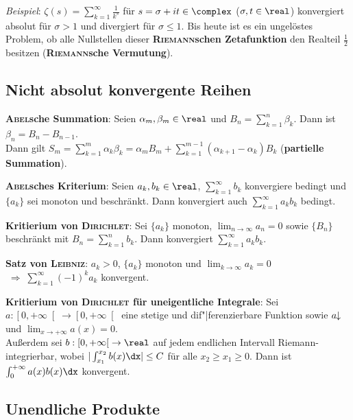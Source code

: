 \emph{Beispiel}: $\zeta(s) = \sum_{k=1}^\infty \frac{1}{k^s}$ für
$s = \sigma + it \in \complex$ ($\sigma, t \in \real$)
konvergiert absolut für $\sigma > 1$ und
divergiert für $\sigma \le 1$.
Bis heute ist es ein ungelöstes Problem, ob alle Nullstellen dieser
\textbf{\textsc{Riemann}schen Zetafunktion} den Realteil $\frac{1}{2}$ besitzen
(\textbf{\textsc{Riemann}sche Vermutung}).

\pagebreak

\subsection{%
    Nicht absolut konvergente Reihen%
}

\textbf{\textsc{Abel}sche Summation}:
Seien $\alpha_m, \beta_m \in \real$ und $B_n = \sum_{k=1}^n \beta_k$.
Dann ist $\beta_n = B_n - B_{n-1}$. \\
Dann gilt $S_m = \sum_{k=1}^m \alpha_k \beta_k =
\alpha_m B_m + \sum_{k=1}^{m-1} (\alpha_{k+1} - \alpha_k) B_k$
(\textbf{partielle Summation}).

\textbf{\textsc{Abel}sches Kriterium}:
Seien $a_k, b_k \in \real$, $\sum_{k=1}^\infty b_k$ konvergiere bedingt
und $\{a_k\}$ sei monoton und beschränkt.
Dann konvergiert auch $\sum_{k=1}^\infty a_k b_k$ bedingt.

\textbf{Kritierium von \textsc{Dirichlet}}:
Sei $\{a_k\}$ monoton, $\lim_{n \to \infty} a_n = 0$ sowie
$\{B_n\}$ beschränkt mit $B_n = \sum_{k=1}^n b_k$.
Dann konvergiert $\sum_{k=1}^\infty a_k b_k$.

\textbf{Satz von \textsc{Leibniz}}:
$a_k > 0$, $\{a_k\}$ monoton und $\lim_{k \to \infty} a_k = 0$
$\;\Rightarrow\; \sum_{k=1}^\infty (-1)^k a_k$ konvergent.

\textbf{Kritierium von \textsc{Dirichlet} für uneigentliche Integrale}:
Sei $a: \left[0, +\infty\right[ \rightarrow \left[0, +\infty\right[$ eine
stetige und dif"|ferenzierbare Funktion sowie $a\!\!\downarrow$ und
$\lim_{x \to +\infty} a(x) = 0$. \\
Außerdem sei $b: \left[0, +\infty\right[ \rightarrow \real$
auf jedem endlichen Intervall Riemann-integrierbar, wobei
$|\int_{x_1}^{x_2} b(x)\dx| \le C$ für alle $x_2 \ge x_1 \ge 0$. \qquad
Dann ist $\int_0^{+\infty} a(x)b(x)\dx$ konvergent.

\subsection{%
    Unendliche Produkte%
}


